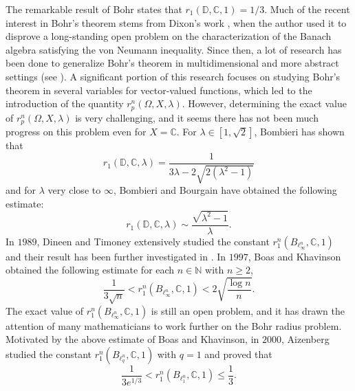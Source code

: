 \documentclass[a4paper,12pt]{amsart}
\theoremstyle{definition}
\newcounter {own}
\begin{document}
 
The remarkable result of Bohr \cite{Bohr-1914} states that $r_1(\mathbb{D},\mathbb{C},1)=1/3$. Much of the recent interest in Bohr's theorem stems from Dixon's work \cite{Dixon & BLMS & 1995}, when the author used it to disprove a long-standing open problem on the characterization of the Banach algebra satisfying the von Neumann inequality. Since then, a lot of research has been done to generalize Bohr's theorem in multidimensional and more abstract settings (see \cite{aizn-2000b}). A significant portion of this research focuses on studying Bohr's theorem in several variables for vector-valued functions, which led to the introduction of the quantity $r^n_p(\Omega,X,\lambda)$. However, determining the exact value of $r^n_p(\Omega,X,\lambda)$ is very challenging, and it seems there has not been much progress on this problem even for $X=\mathbb{C}$. For $\lambda \in [1,\sqrt{2}]$, Bombieri \cite{bombieri-1962} has shown that 
\begin{equation*} r_1(\mathbb{D},\mathbb{C},\lambda)=\frac{1}{3\lambda -2 \sqrt{2(\lambda^2 -1)}} \end{equation*} and for $\lambda$ very close to $\infty$, Bombieri and Bourgain \cite{bombieri-2004} have obtained the following estimate: \begin{equation*} r_1(\mathbb{D},\mathbb{C},\lambda) \sim \frac{\sqrt{\lambda^2 -1}}{\lambda}. \end{equation*}
In $1989$, Dineen and Timoney \cite{Dineen-Timoney-1989} extensively studied the constant $r^n_1(B_{\ell^n _\infty},\mathbb{C},1)$ and their result has been further investigated in \cite{boas-1997}. In $1997$, Boas and Khavinson \cite{boas-1997} obtained the following estimate for each $n \in \mathbb{N}$ with $n \geq 2$,
\begin{equation}\label{Pal-Vasu-P3-e-1.1}
	\frac{1}{3\sqrt{n}} < r^n_1(B_{\ell^n _\infty},\mathbb{C},1) < 2 \sqrt{\frac{\log n}{n}}.	
\end{equation}
The exact value of $r^n_1(B_{\ell^n _\infty},\mathbb{C},1)$ is still an open problem, and it has drawn the attention of many mathematicians to work further on the Bohr radius problem. Motivated by the above estimate of Boas and Khavinson, in $2000$, Aizenberg \cite{aizn-2000a} studied the constant $r^n_1(B_{\ell^n _q},\mathbb{C},1)$ with $q=1$ and proved that
\begin{equation}\label{Pal-Vasu-P3-e-1.2}   
	 \frac{1}{3e^{1/3}} < r^n_1(B_{\ell^n _1},\mathbb{C},1) \leq \frac{1}{3}.
\end{equation}
\end{document}
